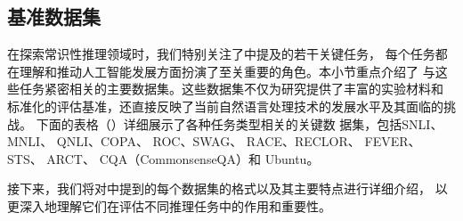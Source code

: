 \subsection{基准数据集}
\label{sec1:benchmarks}

在探索常识性推理领域时，我们特别关注了中提及的若干关键任务，
每个任务都在理解和推动人工智能发展方面扮演了至关重要的角色。本小节重点介绍了
与这些任务紧密相关的主要数据集。这些数据集不仅为研究提供了丰富的实验材料和
标准化的评估基准，还直接反映了当前自然语言处理技术的发展水平及其面临的挑战。
下面的表格（）详细展示了各种任务类型相关的关键数
据集，包括SNLI\cite{bowman2015large}、MNLI\cite{williams2018broad}、
QNLI\cite{wang2018glue}、COPA\cite{roemmele2011choice}、
ROC\cite{mostafazadeh2016corpus}、SWAG\cite{zellers2018swag}、
RACE\cite{lai2017race}、RECLOR\cite{yu2020reclor}、
FEVER\cite{thorne2018fever}、
STS\cite{schuster2019towards}、
ARCT\cite{habernal2018argument}、
CQA（CommonsenseQA）\cite{talmor2019commonsenseqa}和
Ubuntu\cite{lowe2015ubuntu}。


接下来，我们将对中提到的每个数据集的格式以及其主要特点进行详细介绍，
以更深入地理解它们在评估不同推理任务中的作用和重要性。

